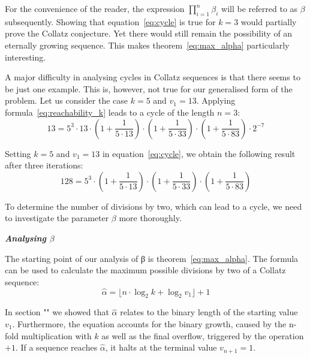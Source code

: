 \documentclass{SciPress_2015}
\renewcommand{\subsection}[1]{\textit{\textbf{#1}}}
\begin{document}
\par\medskip
For the convenience of the reader, the expression $\prod_{i=1}^{n}\beta_i$ will be referred to as $\beta$ subsequently. Showing that equation~\ref{eq:cycle} is true for $k=3$ would partially prove the Collatz conjecture. Yet there would still remain the possibility of an eternally growing sequence. This makes theorem~\ref{eq:max_alpha} particularly interesting.

\par\medskip
A major difficulty in analysing cycles in Collatz sequences is that there seems to be just one example. This is, however, not true for our generalised form of the problem. Let us consider the case $k=5$ and $v_1=13$. Applying formula~\ref{eq:reachability_k} leads to a cycle of the length $n=3$:
\[
13=5^3\cdot13\cdot\left(1+\frac{1}{5\cdot13}\right)\cdot\left(1+\frac{1}{5\cdot33}\right)\cdot\left(1+\frac{1}{5\cdot83}\right)\cdot2^{-7}
\]

Setting $k=5$ and $v_1=13$ in equation~\ref{eq:cycle}, we obtain the following result after three iterations:
\[
128=5^3\cdot\left(1+\frac{1}{5\cdot13}\right)\cdot\left(1+\frac{1}{5\cdot33}\right)\cdot\left(1+\frac{1}{5\cdot83}\right)
\]

To determine the number of divisions by two, which can lead to a cycle, we need to investigate the parameter $\beta$ more thoroughly.

\vspace{1em}\noindent
\subsection{Analysing \boldmath$\beta$}
\par\noindent
The starting point of our analysis of β is theorem~\ref{eq:max_alpha}. The formula can be used to calculate the maximum possible divisions by two of a Collatz sequence:
\[
\hat\alpha=\lfloor n\cdot\log_2k+\log_2v_1\rfloor+1
\]

In section "" we showed that $\hat\alpha$ relates to the binary length of the starting value $v_1$. Furthermore, the equation accounts for the binary growth, caused by the n-fold multiplication with $k$ as well as the final overflow, triggered by the operation $+1$. If a sequence reaches $\hat\alpha$, it halts at the terminal value $v_{n+1}=1$.
\end{document}
